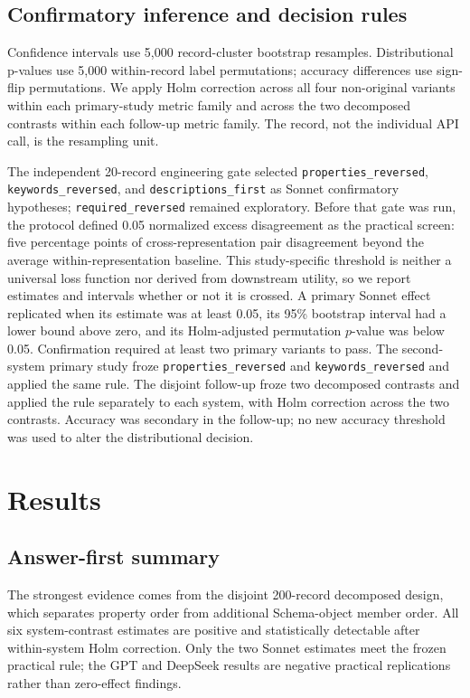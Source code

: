 \documentclass[10pt]{article}
\begin{document}
\subsection{Confirmatory inference and decision rules}
Confidence intervals use 5,000 record-cluster bootstrap resamples. Distributional p-values use 5,000 within-record label permutations; accuracy differences use sign-flip permutations. We apply Holm correction across all four non-original variants within each primary-study metric family and across the two decomposed contrasts within each follow-up metric family. The record, not the individual API call, is the resampling unit.

The independent 20-record engineering gate selected \texttt{properties\_reversed}, \texttt{keywords\_reversed}, and \texttt{descriptions\_first} as Sonnet confirmatory hypotheses; \texttt{required\_reversed} remained exploratory. Before that gate was run, the protocol defined 0.05 normalized excess disagreement as the practical screen: five percentage points of cross-representation pair disagreement beyond the average within-representation baseline. This study-specific threshold is neither a universal loss function nor derived from downstream utility, so we report estimates and intervals whether or not it is crossed. A primary Sonnet effect replicated when its estimate was at least 0.05, its 95\% bootstrap interval had a lower bound above zero, and its Holm-adjusted permutation \(p\)-value was below 0.05. Confirmation required at least two primary variants to pass. The second-system primary study froze \texttt{properties\_reversed} and \texttt{keywords\_reversed} and applied the same rule. The disjoint follow-up froze two decomposed contrasts and applied the rule separately to each system, with Holm correction across the two contrasts. Accuracy was secondary in the follow-up; no new accuracy threshold was used to alter the distributional decision.

\section{Results}
\subsection{Answer-first summary}
The strongest evidence comes from the disjoint 200-record decomposed design, which separates property order from additional Schema-object member order. All six system-contrast estimates are positive and statistically detectable after within-system Holm correction. Only the two Sonnet estimates meet the frozen practical rule; the GPT and DeepSeek results are negative practical replications rather than zero-effect findings.
\end{document}
